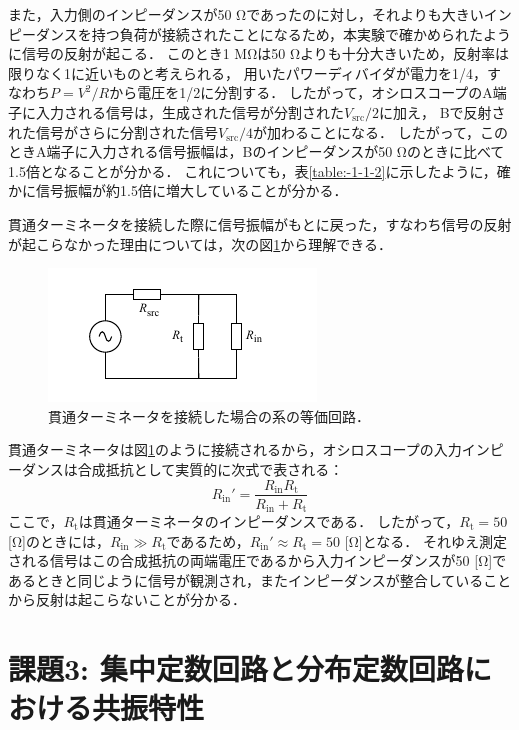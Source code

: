 \documentclass[uplatex,dvipdfmx,a4j,12pt]{jsarticle}
\begin{document}
また，入力側のインピーダンスが50 \si{\ohm}であったのに対し，それよりも大きいインピーダンスを持つ負荷が接続されたことになるため，本実験で確かめられたように信号の反射が起こる．
このとき1 \si{\mega \ohm}は50 \si{\ohm}よりも十分大きいため，反射率は限りなく1に近いものと考えられる，
用いたパワーディバイダが電力を1/4，すなわち$P = V^2/R$から電圧を1/2に分割する．
したがって，オシロスコープのA端子に入力される信号は，生成された信号が分割された$V_\mathrm{src}/2$に加え，
Bで反射された信号がさらに分割された信号$V_\mathrm{src}/4$が加わることになる．
したがって，このときA端子に入力される信号振幅は，Bのインピーダンスが50 \si{\ohm}のときに比べて1.5倍となることが分かる．
これについても，表\ref{table:-1-1-2}に示したように，確かに信号振幅が約1.5倍に増大していることが分かる．

貫通ターミネータを接続した際に信号振幅がもとに戻った，すなわち信号の反射が起こらなかった理由については，次の図\ref{fig:osci_with_terminator}から理解できる．
\begin{figure}[H]
    \centering
    \includegraphics[width=0.5\linewidth]{img/oscilloscope_equiv_circuit_term.pdf}
    \caption{貫通ターミネータを接続した場合の系の等価回路．}
    \label{fig:osci_with_terminator}
\end{figure}
貫通ターミネータは図\ref{fig:osci_with_terminator}のように接続されるから，オシロスコープの入力インピーダンスは合成抵抗として実質的に次式で表される：
\begin{equation}
    R_\mathrm{in}' = \frac{R_\mathrm{in}R_\mathrm{t}}{R_\mathrm{in} + R_\mathrm{t}}
\end{equation}
ここで，$R_\mathrm{t}$は貫通ターミネータのインピーダンスである．
したがって，$R_\mathrm{t} = 50$ [\si{\ohm}]のときには，$R_\mathrm{in} \gg R_\mathrm{t}$であるため，$R_\mathrm{in}' \approx R_\mathrm{t} = 50$ [\si{\ohm}]となる．
それゆえ測定される信号はこの合成抵抗の両端電圧であるから入力インピーダンスが50 [\si{\ohm}]であるときと同じように信号が観測され，またインピーダンスが整合していることから反射は起こらないことが分かる．


\section{課題3: 集中定数回路と分布定数回路における共振特性}
\end{document}
